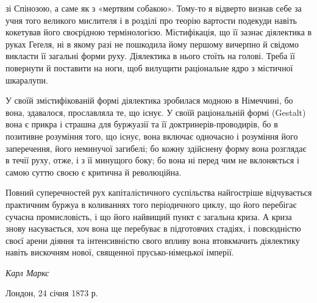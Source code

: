 \parcont{}  %
зі Спінозою, а саме як з «мертвим собакою». Тому-то я відверто
визнав себе за учня того великого мислителя і в розділі про теорію
вартости подекуди навіть кокетував його своєрідною термінологією.
Містифікація, що її зазнає діялектика в руках Геґеля, ні в
якому разі не пошкодила йому першому вичерпно й свідомо викласти
її загальні форми руху. Діялектика в нього стоїть на голові.
Треба її повернути й поставити на ноги, щоб вилущити раціональне
ядро з містичної шкаралупи.

У своїй змістифікованій формі діялектика зробилася модною
в Німеччині, бо вона, здавалося, прославляла те, що існує.
У своїй раціональній формі (Gestalt) вона є прикра і страшна для
буржуазії та її доктринерів-проводирів, бо в позитивне розуміння
того, що існує, вона включає одночасно і розуміння його
заперечення, його неминучої загибелі; бо кожну здійснену форму
вона розглядає в течії руху, отже, і з її минущого боку; бо вона
ні перед чим не вклоняється і самою суттю своєю є критична
й революційна.

Повний суперечностей рух капіталістичного суспільства найгостріше
відчувається практичним буржуа в коливаннях того періодичного
циклу, що його перебігає сучасна промисловість, і що
його найвищий пункт є загальна криза. А криза знову насувається,
хоч вона ще перебуває в підготовчих стадіях, і повсюдністю
своєї арени діяння та інтенсивністю свого впливу вона
втовкмачить діялектику навіть вискочням нової, священної прусько-німецької
імперії.

\begin{flushright}
\emph{Карл Маркс}
\end{flushright}

{\small Лондон, 24 січня 1873 р.}
\label{original-88}